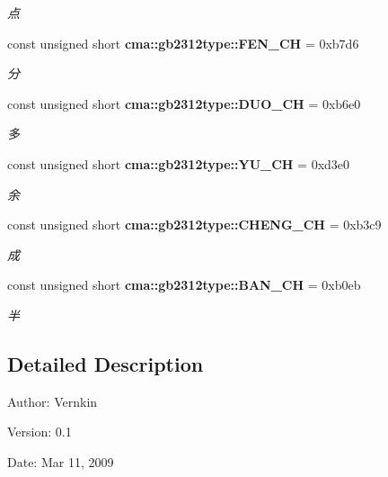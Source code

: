 \begin{CompactItemize}
\begin{CompactList}\small\item\em 点 \item\end{CompactList}\item 
const unsigned short {\bf cma::gb2312type::FEN\_\-CH} = 0xb7d6\label{namespacecma_1_1gb2312type_7742aecda5012381927b913f08321b58}

\begin{CompactList}\small\item\em 分 \item\end{CompactList}\item 
const unsigned short {\bf cma::gb2312type::DUO\_\-CH} = 0xb6e0\label{namespacecma_1_1gb2312type_72389d3fac67d40d030ddd29122066f0}

\begin{CompactList}\small\item\em 多 \item\end{CompactList}\item 
const unsigned short {\bf cma::gb2312type::YU\_\-CH} = 0xd3e0\label{namespacecma_1_1gb2312type_cbe5cc72fe68a17ca2b6b3d6d0123e44}

\begin{CompactList}\small\item\em 余 \item\end{CompactList}\item 
const unsigned short {\bf cma::gb2312type::CHENG\_\-CH} = 0xb3c9\label{namespacecma_1_1gb2312type_59704f9b146ddd85cdea099786e71762}

\begin{CompactList}\small\item\em 成 \item\end{CompactList}\item 
const unsigned short {\bf cma::gb2312type::BAN\_\-CH} = 0xb0eb\label{namespacecma_1_1gb2312type_1e107f05eafdd7317a1560c2a220be37}

\begin{CompactList}\small\item\em 半 \item\end{CompactList}\end{CompactItemize}


\subsection{Detailed Description}
\begin{Desc}
\item[Author:]Vernkin \end{Desc}
\begin{Desc}
\item[Version:]0.1 \end{Desc}
\begin{Desc}
\item[Date:]Mar 11, 2009 \end{Desc}

